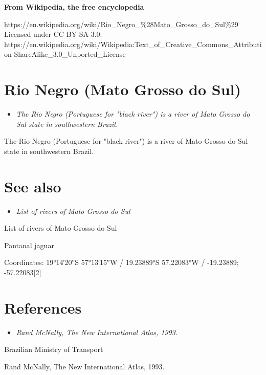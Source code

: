 \textbf{From Wikipedia, the free encyclopedia}

https://en.wikipedia.org/wiki/Rio\_Negro\_\%28Mato\_Grosso\_do\_Sul\%29\\
Licensed under CC BY-SA 3.0:\\
https://en.wikipedia.org/wiki/Wikipedia:Text\_of\_Creative\_Commons\_Attribution-ShareAlike\_3.0\_Unported\_License

\section{Rio Negro (Mato Grosso do
Sul)}\label{rio-negro-mato-grosso-do-sul}

\begin{itemize}
\item
  \emph{The Rio Negro (Portuguese for "black river") is a river of Mato
  Grosso do Sul state in southwestern Brazil.}
\end{itemize}

The Rio Negro (Portuguese for "black river") is a river of Mato Grosso
do Sul state in southwestern Brazil.

\section{See also}\label{see-also}

\begin{itemize}
\item
  \emph{List of rivers of Mato Grosso do Sul}
\end{itemize}

List of rivers of Mato Grosso do Sul

Pantanal jaguar

Coordinates: 19°14′20″S 57°13′15″W﻿ / ﻿19.23889°S 57.22083°W﻿ /
-19.23889; -57.22083{[}2{]}

\section{References}\label{references}

\begin{itemize}
\item
  \emph{Rand McNally, The New International Atlas, 1993.}
\end{itemize}

Brazilian Ministry of Transport

Rand McNally, The New International Atlas, 1993.

